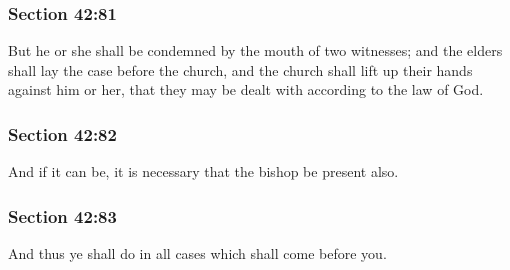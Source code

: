 	\subsubsection{Section 42:81} %
		\label{DC42-81}

		But he or she shall be condemned by the mouth of two witnesses; and the elders shall lay the case before the church, and the church shall lift up their hands against him or her, that they may be dealt with according to the law of God.


	\subsubsection{Section 42:82} %
		\label{DC42-82}

		And if it can be, it is necessary that the bishop be present also.


	\subsubsection{Section 42:83} %
		\label{DC42-83}

		And thus ye shall do in all cases which shall come before you.


